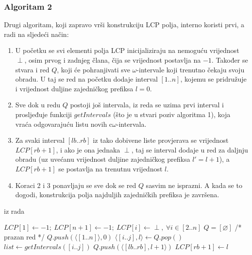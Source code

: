 \documentclass[a4paper,12pt]{article}
\begin{document}
\clearpage
\subsubsection{Algoritam 2}

Drugi algoritam, koji zapravo vrši konstrukciju LCP polja, interno koristi prvi, a radi na sljedeći način:

\begin{enumerate}
	\item U početku se svi elementi polja LCP inicijaliziraju na nemoguću vrijednost $\perp$, osim prvog i zadnjeg člana, čija se vrijednost postavlja na $-1$. Također se stvara i red $Q$, koji će pohranjivati sve $\omega$-intervale koji trenutno čekaju svoju obradu. U taj se red na početku dodaje interval $[1..n]$, kojemu se pridružuje i vrijednost duljine zajedničkog prefiksa $l = 0$.
	\item Sve dok u redu $Q$ postoji još intervala, iz reda se uzima prvi interval i prosljeđuje funkciji $getIntervals$ (što je u stvari poziv algoritma 1), koja vraća odgovarajuću listu novih c$\omega$-intervala.
	\item Za svaki interval ${[lb..rb]}$ iz tako dobivene liste provjerava se vrijednost $LCP[rb+1]$, i ako je ona jednaka $\perp$, taj se interval dodaje u red za daljnju obradu (uz uvećanu vrijednost duljine zajedničkog prefiksa $l' = l+1$), a $LCP[rb+1]$ se postavlja na trenutnu vrijednost $l$.
	\item Koraci 2 i 3 ponavljaju se sve dok se red $Q$ sasvim ne isprazni. A kada se to dogodi, konstrukcija polja najduljih zajedničkih prefiksa je završena.
\end{enumerate}

\begin{algorithm}[H]
	\caption{iz rada \cite{beller2013}}
	\label{alg2}
	\begin{algorithmic}
		\State $LCP[1] \gets -1;\ LCP[n+1] \gets -1;\ LCP[i] \gets \perp,\ \forall i \in [2..n]$
		\State $Q = [\varnothing]$ /* prazan red */
		\State $Q.push(\langle[1..n]\rangle, 0)$
			\State $\langle[i..j], l\rangle \gets Q.pop()$
			\State $list \gets \textit{getIntervals}([i..j])$
					\State $Q.push(\langle[lb..rb],l+1\rangle)$
					\State $LCP[rb+1] \gets l$
				\EndIf
			\EndFor
		\EndWhile
	\end{algorithmic}
\end{algorithm}

\clearpage
\end{document}
